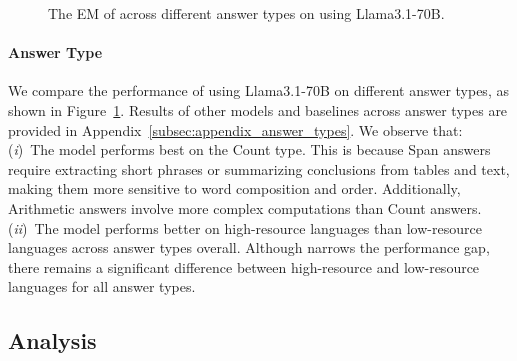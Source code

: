 \begin{figure}[t]
    \centering
    
    \vspace{-0.5em}
    \caption{
        The EM of \ourmethod across different answer types on \ourdataset using Llama3.1-70B.
    }
    \label{fig:answer_type}
    \vspace{-1em}
\end{figure}

\paragraph{Answer Type}
We compare the performance of \ourmethod using Llama3.1-70B on different answer types, as shown in Figure~\ref{fig:answer_type}. 
Results of other models and baselines across answer types are provided in Appendix~\ref{subsec:appendix_answer_types}. 
We observe that:
(\emph{i})~The model performs best on the Count type. 
This is because Span answers require extracting short phrases or summarizing conclusions from tables and text, making them more sensitive to word composition and order. 
Additionally, Arithmetic answers involve more complex computations than Count answers.
(\emph{ii})~The model performs better on high-resource languages than low-resource languages across answer types overall. 
Although \ourmethod narrows the performance gap, there remains a significant difference between high-resource and low-resource languages for all answer types.

\subsection{Analysis}

\begin{table*}[ht]
\centering
\tiny

\caption{
EM (above) and F1 (below) of \ourmethod using the instructions and demonstrations of different languages on Llama3.1-70B.
The best results under each language are annotated in \textbf{bold}. 
Demo refers to demonstrations. 
Multi refers to demonstrations composed of multiple languages (English, Spanish, and Chinese).
Avg. denotes the average performance of the baseline across all languages.
}
\label{tab:prompt_language}
\end{table*}

